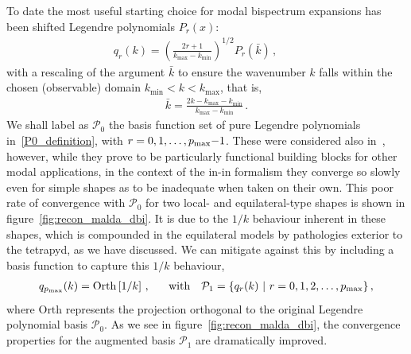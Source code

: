 \documentclass[a4paper,12pt]{extarticle}
\newcommand{\kbar}{\bar{k}}
\newcommand{\Lbasic}{\mathcal{P}_0}
\newcommand{\Linvk}{\mathcal{P}_1}
\newcommand{\kmin}{{k_\text{min}}}
\newcommand{\kmax}{{k_\text{max}}}
\begin{document}
To date the most useful starting choice for modal bispectrum expansions has been shifted Legendre polynomials $P_r(x)$:
\begin{align}\label{P0_definition}
    q_{r}(k) = \left(\frac{2r+1} {\kmax - \kmin}\right)^{1/2} P_r(\kbar)\,,\qquad 
\end{align}
with a rescaling of the argument $\kbar$ to ensure the wavenumber $k$ falls within the chosen (observable) domain $\kmin< k<\kmax$, that is, 
\begin{align}\label{krescaled}
    \kbar=\frac{2k-\kmax-\kmin}{\kmax-\kmin}\,.
\end{align}
We shall label as $\Lbasic$ the basis function set of pure Legendre polynomials in~\eqref{P0_definition},
with $r=0,1,\dots, p_{\rm max}\text{$-$}1$.
These were considered also in~\cite{Funakoshi}, however,
while they prove to be particularly functional building blocks for other modal applications,
in the context of the in-in formalism
they converge so slowly even for simple shapes as to be inadequate when taken on their own.
This poor rate of convergence with $\Lbasic$ for two local- and equilateral-type shapes is shown in figure~\ref{fig:recon_malda_dbi}.
It is due to the $1/k$ behaviour inherent in these shapes,
which is compounded in the equilateral models by pathologies exterior to the tetrapyd,
as we have discussed.
We can mitigate against this by including a basis function to capture this $1/k$ behaviour, 
\begin{align}\label{P1_definition}
    q_{p_{\rm max}}(k) = \text{Orth}\left[{1}/ {k}\right]\,, ~~ \quad \text{with} \quad  \Linvk = \{ q_r(k) ~\vert~ r= 0, 1,2, \dots , p_{\rm max}\}\,,
\end{align}
where $\text{Orth}$ represents the projection orthogonal to the original Legendre polynomial basis $\Lbasic$.
As we see in figure~\ref{fig:recon_malda_dbi}, the convergence properties for the augmented basis  $\Linvk$ are dramatically improved.
\end{document}
